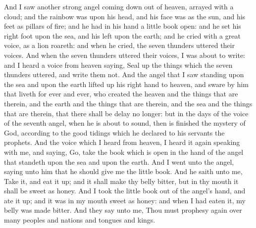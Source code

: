 And I saw another strong angel coming down out of heaven, arrayed with a cloud; and the rainbow was upon his head, and his face was as the sun, and his feet as pillars of fire; and he had in his hand a little book open: and he set his right foot upon the sea, and his left upon the earth; and he cried with a great voice, as a lion roareth: and when he cried, the seven thunders uttered their voices. And when the seven thunders uttered their voices, I was about to write: and I heard a voice from heaven saying, Seal up the things which the seven thunders uttered, and write them not. And the angel that I saw standing upon the sea and upon the earth lifted up his right hand to heaven, and sware by him that liveth for ever and ever, who created the heaven and the things that are therein, and the earth and the things that are therein, and the sea and the things that are therein, that there shall be delay no longer: but in the days of the voice of the seventh angel, when he is about to sound, then is finished the mystery of God, according to the good tidings which he declared to his servants the prophets. And the voice which I heard from heaven, I heard it again speaking with me, and saying, Go, take the book which is open in the hand of the angel that standeth upon the sea and upon the earth. And I went unto the angel, saying unto him that he should give me the little book. And he saith unto me, Take it, and eat it up; and it shall make thy belly bitter, but in thy mouth it shall be sweet as honey. And I took the little book out of the angel’s hand, and ate it up; and it was in my mouth sweet as honey: and when I had eaten it, my belly was made bitter. And they say unto me, Thou must prophesy again over many peoples and nations and tongues and kings. 

